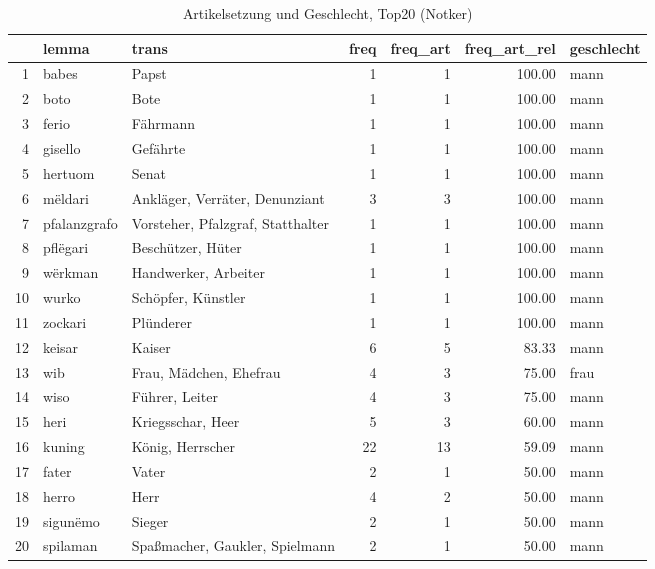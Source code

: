 \begin{table}[ht]
\centering
\begin{tabular}{rllrrrl}
  \hline
 & lemma & trans & freq & freq\_art & freq\_art\_rel & geschlecht \\ 
  \hline
1 & babes & Papst &   1 &   1 & 100.00 & mann \\ 
  2 & boto & Bote &   1 &   1 & 100.00 & mann \\ 
  3 & ferio & Fährmann &   1 &   1 & 100.00 & mann \\ 
  4 & gisello & Gefährte &   1 &   1 & 100.00 & mann \\ 
  5 & hertuom & Senat &   1 &   1 & 100.00 & mann \\ 
  6 & mëldari & Ankläger, Verräter, Denunziant &   3 &   3 & 100.00 & mann \\ 
  7 & pfalanzgrafo & Vorsteher, Pfalzgraf, Statthalter &   1 &   1 & 100.00 & mann \\ 
  8 & pflëgari & Beschützer, Hüter &   1 &   1 & 100.00 & mann \\ 
  9 & wërkman & Handwerker, Arbeiter &   1 &   1 & 100.00 & mann \\ 
  10 & wurko & Schöpfer, Künstler &   1 &   1 & 100.00 & mann \\ 
  11 & zockari & Plünderer &   1 &   1 & 100.00 & mann \\ 
  12 & keisar & Kaiser &   6 &   5 & 83.33 & mann \\ 
  13 & wib & Frau, Mädchen, Ehefrau &   4 &   3 & 75.00 & frau \\ 
  14 & wiso & Führer, Leiter &   4 &   3 & 75.00 & mann \\ 
  15 & heri & Kriegsschar, Heer &   5 &   3 & 60.00 & mann \\ 
  16 & kuning & König, Herrscher &  22 &  13 & 59.09 & mann \\ 
  17 & fater & Vater &   2 &   1 & 50.00 & mann \\ 
  18 & herro & Herr &   4 &   2 & 50.00 & mann \\ 
  19 & sigunëmo & Sieger &   2 &   1 & 50.00 & mann \\ 
  20 & spilaman & Spaßmacher, Gaukler, Spielmann &   2 &   1 & 50.00 & mann \\ 
   \hline
\end{tabular}
\caption{Artikelsetzung und Geschlecht, Top20  (Notker)} 
\end{table}
